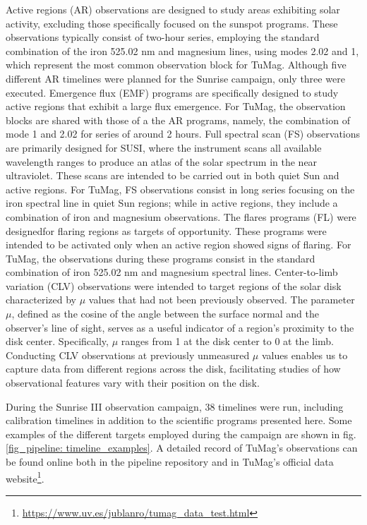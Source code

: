 \begin{itemize}
  \Myitem Active regions (AR) observations are designed to study areas exhibiting solar activity, excluding those specifically focused on the sunspot programs. These observations typically consist of two-hour series, employing the standard combination of the iron 525.02 nm and magnesium lines, using modes 2.02 and 1, which represent the most common observation block for TuMag. Although five different AR timelines were planned for the Sunrise campaign, only three were executed.
  \Myitem Emergence flux (EMF) programs are specifically designed to study active regions that exhibit a large flux emergence. For TuMag, the observation blocks are shared with those of a the AR programs, namely, the combination of mode 1 and 2.02 for series of around 2 hours. 
  \Myitem Full spectral scan (FS) observations are primarily designed for SUSI, where the instrument scans all available wavelength ranges to produce an atlas of the solar spectrum in the near ultraviolet. These scans are intended to be carried out in both quiet Sun and active regions. For TuMag, FS observations consist in long series focusing on the iron spectral line in quiet Sun regions; while in active regions, they include a combination of iron and magnesium observations.
  \Myitem The flares programs (FL) were designedfor flaring regions as targets of opportunity. These programs were intended to be activated only when an active region showed signs of flaring. For TuMag, the observations during these programs consist in the standard combination of iron 525.02 nm and magnesium spectral lines.
  \Myitem Center-to-limb variation (CLV) observations were intended to target regions of the solar disk characterized by $\mu$ values that had not been previously observed. The parameter $\mu$, defined as the cosine of the angle between the surface normal and the observer's line of sight, serves as a useful indicator of a region's proximity to the disk center. Specifically, $\mu$ ranges from 1 at the disk center to 0 at the limb. Conducting CLV observations at previously unmeasured $\mu$ values enables us to capture data from different regions across the disk, facilitating studies of how observational features vary with their position on the disk. 
\end{itemize}

During the Sunrise III observation campaign, 38 timelines were run, including calibration timelines in addition to the scientific programs presented here. Some examples of the different targets employed during the campaign are shown in fig. \ref{fig_pipeline: timeline_examples}.  A detailed record of TuMag's observations can be found online both in the pipeline repository and in TuMag's official data website\footnote{\url{https://www.uv.es/jublanro/tumag_data_test.html}}.  

